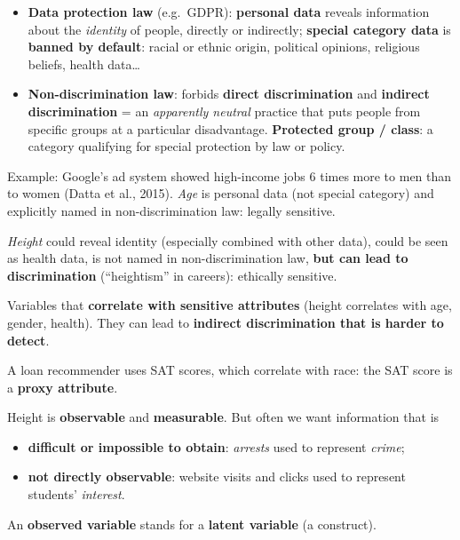\documentclass[11pt,a4paper,openany]{book}
\begin{document}
\begin{defnbox}[title={Legally sensitive (van Bekkum \& Zuiderveen Borgesius, 2023)}]
\begin{itemize}
  \item \textbf{Data protection law} (e.g.\ GDPR): \textbf{personal data} reveals information
        about the \emph{identity} of people, directly or indirectly; \textbf{special category
        data} is \textbf{banned by default}: racial or ethnic origin, political opinions,
        religious beliefs, health data\ldots
  \item \textbf{Non-discrimination law}: forbids \textbf{direct discrimination} and
        \textbf{indirect discrimination} = an \emph{apparently neutral} practice that puts people
        from specific groups at a particular disadvantage. \textbf{Protected group / class}: a
        category qualifying for special protection by law or policy.
\end{itemize}
Example: Google's ad system showed high-income jobs 6 times more to men than to women (Datta et
al., 2015). \emph{Age} is personal data (not special category) and explicitly named in
non-discrimination law: legally sensitive.
\end{defnbox}

\begin{defnbox}[title={Ethically sensitive (Imtiaz, 2022)}]
\emph{Height} could reveal identity (especially combined with other data), could be seen as
health data, is not named in non-discrimination law, \textbf{but can lead to discrimination}
(``heightism'' in careers): ethically sensitive.
\end{defnbox}

\begin{defnbox}[title={Proxy attributes}]
Variables that \textbf{correlate with sensitive attributes} (height correlates with age, gender,
health). They can lead to \textbf{indirect discrimination that is harder to detect}.
\end{defnbox}

\begin{exbox}[title={Exam-type question}]
A loan recommender uses SAT scores, which correlate with race: the SAT score is a \textbf{proxy
attribute}.
\end{exbox}

\begin{defnbox}[title={Simplifying reality (Jacobs \& Wallach, 2021)}]
Height is \textbf{observable} and \textbf{measurable}. But often we want information that is
\begin{itemize}
  \item \textbf{difficult or impossible to obtain}: \emph{arrests} used to represent \emph{crime};
  \item \textbf{not directly observable}: website visits and clicks used to represent students'
        \emph{interest}.
\end{itemize}
An \textbf{observed variable} stands for a \textbf{latent variable} (a construct).
\end{defnbox}
\end{document}
